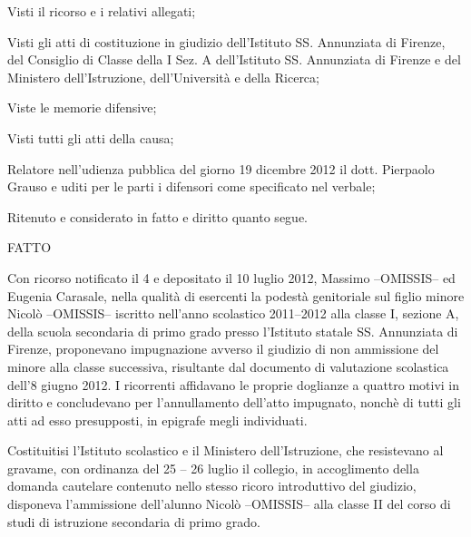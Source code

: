 Visti il ricorso e i relativi allegati;

Visti gli atti di costituzione in giudizio dell'Istituto SS. Annunziata di Firenze, del Consiglio di Classe della I Sez. A dell'Istituto SS. Annunziata di Firenze e del Ministero dell'Istruzione, dell'Università e della Ricerca;

Viste le memorie difensive;

Visti tutti gli atti della causa;

Relatore nell'udienza pubblica del giorno 19 dicembre 2012 il dott. Pierpaolo Grauso e uditi per le parti i difensori come specificato nel verbale;

Ritenuto e considerato in fatto e diritto quanto segue.
\begin{center}
	FATTO
\end{center} 
Con ricorso notificato il 4 e depositato il 10 luglio 2012, Massimo --OMISSIS-- ed Eugenia Carasale, nella qualità di esercenti la podestà genitoriale sul figlio minore Nicolò --OMISSIS-- iscritto nell'anno scolastico 2011--2012 alla classe I, sezione A, della scuola secondaria di primo grado presso l'Istituto statale SS. Annunziata di Firenze, proponevano impugnazione avverso il giudizio di non ammissione del minore alla classe successiva, risultante dal documento di valutazione scolastica dell'8 giugno 2012. I ricorrenti affidavano le proprie doglianze a quattro motivi in diritto e concludevano per l'annullamento dell'atto impugnato, nonchè di tutti gli atti ad esso presupposti, in epigrafe megli individuati.

Costituitisi l'Istituto scolastico e il Ministero dell'Istruzione, che resistevano al gravame, con ordinanza del 25 -- 26 luglio il collegio, in accoglimento della domanda cautelare contenuto nello stesso ricoro introduttivo del giudizio, disponeva l'ammissione dell'alunno Nicolò --OMISSIS-- alla classe II del corso di studi di istruzione secondaria di primo grado.

